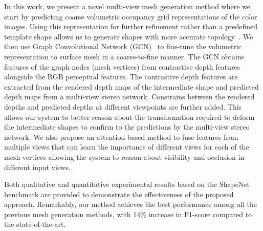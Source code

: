 

In this work, we present a novel multi-view mesh generation method where we start by predicting coarse volumetric occupancy grid representations of the color images.
Using this representation for further refinement rather than a predefined template shape allows us to generate shapes with more accurate topology~\cite{gkioxari2019meshrcnn}.
We then use Graph Convolutional Network (GCN)~\cite{scarselli2008graph,wang2018pixel2mesh} to fine-tune the volumetric representation to surface mesh in a coarse-to-fine manner.
The GCN obtains features of the graph nodes (mesh vertices) from contrastive depth features alongside the RGB perceptual features.
The contrastive depth features are extracted from the rendered depth maps of the intermediate shape and predicted depth maps from a multi-view stereo network.
Constrains between the rendered depths and predicted depths at different viewpoints are further added.
This allows our system to better reason about the transformation required to deform the intermediate shapes to confirm to the predictions by the multi-view stereo network.
We also propose an attention-based method to fuse features from multiple views that can learn the importance of different views for each of the mesh vertices allowing the system to reason about visibility and occlusion in different input views.

Both qualitative and quantitative experimental results based on the ShapeNet~\cite{chang2015shapenet} benchmark are provided to demonstrate the effectiveness of the proposed approach. Remarkably, our method achieves the best performance among all the previous mesh generation methods, with 14\% increase in F1-score compared to the state-of-the-art.


